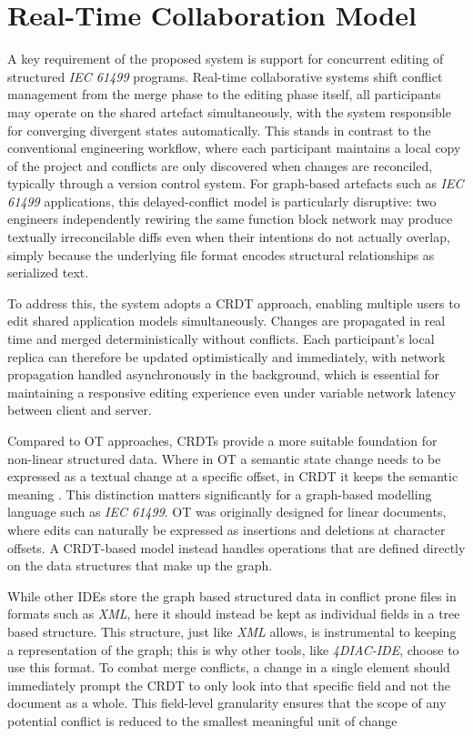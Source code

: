 \section{Real-Time Collaboration Model}
A key requirement of the proposed system is support for concurrent editing of structured \textit{IEC 61499} programs. Real-time collaborative systems shift conflict management from the merge phase to the editing phase itself, all participants may operate on the shared artefact simultaneously, with the system responsible for converging divergent states automatically. This stands in contrast to the conventional engineering workflow, where each participant maintains a local copy of the project and conflicts are only discovered when changes are reconciled, typically through a version control system. For graph-based artefacts such as \textit{IEC 61499} applications, this delayed-conflict model is particularly disruptive: two engineers independently rewiring the same function block network may produce textually irreconcilable diffs even when their intentions do not actually overlap, simply because the underlying file format encodes structural relationships as serialized text.

To address this, the system adopts a \ac{CRDT} approach, enabling multiple users to edit shared application models simultaneously. Changes are propagated in real time and merged deterministically without conflicts.  Each participant's local replica can therefore be updated optimistically and immediately, with network propagation handled asynchronously in the background, which is essential for maintaining a responsive editing experience even under variable network latency between client and server.

Compared to \ac{OT} approaches, \acp{CRDT} provide a more suitable foundation for non-linear structured data. Where in \ac{OT} a semantic state change needs to be expressed as a textual change at a specific offset, in \ac{CRDT} it keeps the semantic meaning \cite{kleppmann_conflict-free_2017}. This distinction matters significantly for a graph-based modelling language such as \textit{IEC 61499}. \ac{OT} was originally designed for linear documents, where edits can naturally be expressed as insertions and deletions at character offsets. A \ac{CRDT}-based model instead handles operations that are defined directly on the data structures that make up the graph.

While other \acp{IDE} store the graph based structured data in conflict prone files in formats such as \textit{XML}, here it should instead be kept as individual fields in a tree based structure. This structure, just like \textit{XML} allows, is instrumental to keeping a representation of the graph; this is why other tools, like \textit{4DIAC-IDE}, choose to use this format. To combat merge conflicts, a change in a single element should immediately prompt the \ac{CRDT} to only look into that specific field and not the document as a whole. This field-level granularity ensures that the scope of any potential conflict is reduced to the smallest meaningful unit of change

